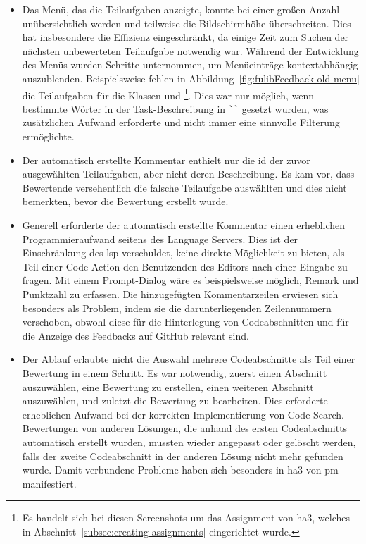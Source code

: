 \begin{itemize}
    \item Das Menü, das die Teilaufgaben anzeigte, konnte bei einer großen Anzahl unübersichtlich werden und teilweise die Bildschirmhöhe überschreiten.
    Dies hat insbesondere die Effizienz eingeschränkt, da einige Zeit zum Suchen der nächsten unbewerteten Teilaufgabe notwendig war.
    Während der Entwicklung des Menüs wurden Schritte unternommen, um Menüeinträge kontextabhängig auszublenden.
    Beispielsweise fehlen in Abbildung~\ref{fig:fulibFeedback-old-menu} die Teilaufgaben für die Klassen  und \footnote{
        Es handelt sich bei diesen Screenshots um das Assignment von \ac{ha}3, welches in Abschnitt~\ref{subsec:creating-assignments} eingerichtet wurde.
    }.
    Dies war nur möglich, wenn bestimmte Wörter in der Task-Beschreibung in \verb|``| gesetzt wurden, was zusätzlichen Aufwand erforderte und nicht immer eine sinnvolle Filterung ermöglichte.
    \item Der automatisch erstellte Kommentar enthielt nur die \ac{id} der zuvor ausgewählten Teilaufgaben, aber nicht deren Beschreibung.
    Es kam vor, dass Bewertende versehentlich die falsche Teilaufgabe auswählten und dies nicht bemerkten, bevor die Bewertung erstellt wurde.
    \item Generell erforderte der automatisch erstellte Kommentar einen erheblichen Programmieraufwand seitens des Language Servers.
    Dies ist der Einschränkung des \ac{lsp} verschuldet, keine direkte Möglichkeit zu bieten, als Teil einer Code Action den Benutzenden des Editors nach einer Eingabe zu fragen.
    Mit einem Prompt-Dialog wäre es beispielsweise möglich, Remark und Punktzahl zu erfassen.
    Die hinzugefügten Kommentarzeilen erwiesen sich besonders als Problem, indem sie die darunterliegenden Zeilennummern verschoben, obwohl diese für die Hinterlegung von Codeabschnitten und für die Anzeige des Feedbacks auf GitHub relevant sind.
    \item Der Ablauf erlaubte nicht die Auswahl mehrere Codeabschnitte als Teil einer Bewertung in einem Schritt.
    Es war notwendig, zuerst einen Abschnitt auszuwählen, eine Bewertung zu erstellen, einen weiteren Abschnitt auszuwählen, und zuletzt die Bewertung zu bearbeiten.
    Dies erforderte erheblichen Aufwand bei der korrekten Implementierung von Code Search.
    Bewertungen von anderen Lösungen, die anhand des ersten Codeabschnitts automatisch erstellt wurden, mussten wieder angepasst oder gelöscht werden, falls der zweite Codeabschnitt in der anderen Lösung nicht mehr gefunden wurde.
    Damit verbundene Probleme haben sich besonders in \ac{ha}3 von \ac{pm} manifestiert.
\end{itemize}

